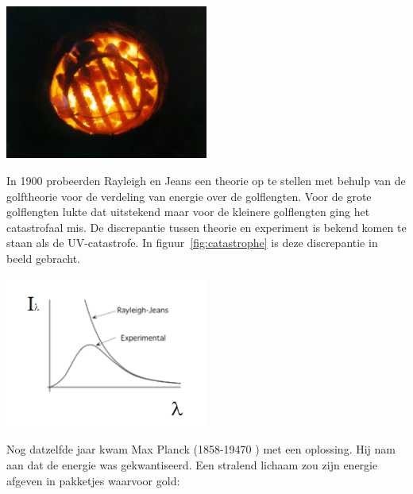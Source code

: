 \documentclass[../main.tex]{subfiles}
\begin{document}
\begin{center}
\leavevmode
\includegraphics[width=0.5\textwidth]{./img/temperatuurstraling.png}
\end{center}

In 1900 probeerden Rayleigh en Jeans een theorie op te stellen met behulp van de golftheorie voor de verdeling van energie over de golflengten. Voor de grote golflengten lukte dat uitstekend maar voor de kleinere golflengten ging het catastrofaal mis. De discrepantie tussen theorie en experiment is bekend komen te staan als de UV-catastrofe.
In figuur~\ref{fig:catastrophe} is deze discrepantie in beeld gebracht.

\begin{center}
\leavevmode
\includegraphics[width=0.5\textwidth]{./img/catastrophe.png}
\end{center}

Nog datzelfde jaar kwam Max Planck (1858-19470 ) met een oplossing. Hij nam aan dat de energie was gekwantiseerd. Een stralend lichaam zou zijn energie afgeven in pakketjes waarvoor gold:
\end{document}

